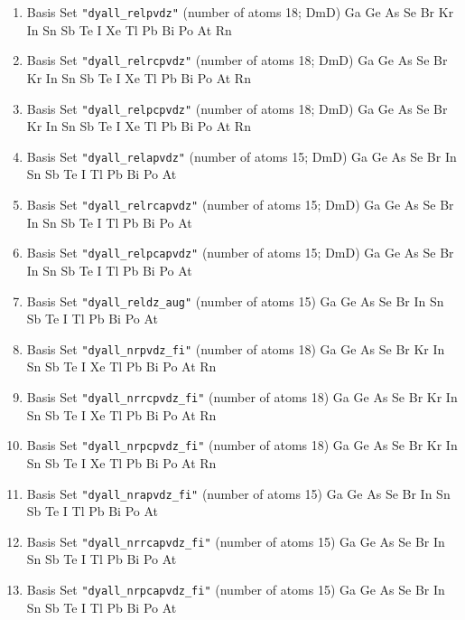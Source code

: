 \begin{enumerate}
\item Basis Set \verb#"dyall_relpvdz"# (number of atoms 18; DmD)  \newline 
  Ga Ge As Se Br Kr In Sn Sb Te I Xe Tl Pb Bi Po At Rn

\item Basis Set \verb#"dyall_relrcpvdz"# (number of atoms 18; DmD)  \newline 
  Ga Ge As Se Br Kr In Sn Sb Te I Xe Tl Pb Bi Po At Rn

\item Basis Set \verb#"dyall_relpcpvdz"# (number of atoms 18; DmD)  \newline 
  Ga Ge As Se Br Kr In Sn Sb Te I Xe Tl Pb Bi Po At Rn

\item Basis Set \verb#"dyall_relapvdz"# (number of atoms 15; DmD)  \newline 
  Ga Ge As Se Br In Sn Sb Te I Tl Pb Bi Po At

\item Basis Set \verb#"dyall_relrcapvdz"# (number of atoms 15; DmD)  \newline 
  Ga Ge As Se Br In Sn Sb Te I Tl Pb Bi Po At

\item Basis Set \verb#"dyall_relpcapvdz"# (number of atoms 15; DmD)  \newline 
  Ga Ge As Se Br In Sn Sb Te I Tl Pb Bi Po At

\item Basis Set \verb#"dyall_reldz_aug"# (number of atoms 15)  \newline
  Ga Ge As Se Br In Sn Sb Te I Tl Pb Bi Po At


\item Basis Set \verb#"dyall_nrpvdz_fi"# (number of atoms 18)  \newline 
  Ga Ge As Se Br Kr In Sn Sb Te I Xe Tl Pb Bi Po At Rn

\item Basis Set \verb#"dyall_nrrcpvdz_fi"# (number of atoms 18)  \newline 
  Ga Ge As Se Br Kr In Sn Sb Te I Xe Tl Pb Bi Po At Rn

\item Basis Set \verb#"dyall_nrpcpvdz_fi"# (number of atoms 18)  \newline 
  Ga Ge As Se Br Kr In Sn Sb Te I Xe Tl Pb Bi Po At Rn

\item Basis Set \verb#"dyall_nrapvdz_fi"# (number of atoms 15)  \newline 
  Ga Ge As Se Br In Sn Sb Te I Tl Pb Bi Po At

\item Basis Set \verb#"dyall_nrrcapvdz_fi"# (number of atoms 15)  \newline 
  Ga Ge As Se Br In Sn Sb Te I Tl Pb Bi Po At

\item Basis Set \verb#"dyall_nrpcapvdz_fi"# (number of atoms 15)  \newline 
  Ga Ge As Se Br In Sn Sb Te I Tl Pb Bi Po At



\end{enumerate}

\fussy

